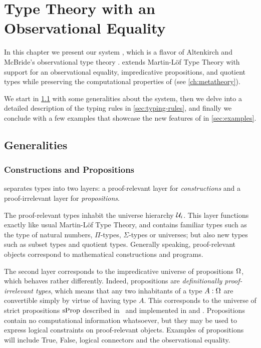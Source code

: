 \chapter{Type Theory with an Observational Equality}
\label{sec:type-theory-with}

% 
In this chapter we present our system \SetoidCC, which is a flavor of 
Altenkirch and McBride's observational type theory .
% 
\SetoidCC extends Martin-Löf Type Theory with support for an observational 
equality, impredicative propositions, and quotient types while preserving the
computational properties of \MLTT (see \cref{ch:metatheory}).

We start in \cref{sec:generalities} with some generalities about the system, then we delve 
into a detailed description of the typing rules in \cref{sec:typing-rules}, and 
finally we conclude with a few examples that showcase the new features of 
\SetoidCC in \cref{sec:examples}.

\section{Generalities}
\label{sec:generalities}

\subsection{Constructions and Propositions}

\SetoidCC separates types into two layers: a proof-relevant layer for 
\emph{constructions} and a proof-irrelevant layer for \emph{propositions}. 

The proof-relevant types inhabit the universe hierarchy \( \mathcal{U}_i \).
% 
This layer functions exactly like usual Martin-Löf Type Theory, and
contains familiar types
such as the type of natural numbers, \( \Pi \)-types, \( \Sigma \)-types or 
universes; but also new types such as subset types and quotient types.
% 
Generally speaking, proof-relevant objects correspond to mathematical 
constructions and programs.

The second layer corresponds to the impredicative universe of propositions 
\( \Omega \), which behaves rather differently.
% 
Indeed, propositions are \emph{definitionally proof-irrelevant types}, which 
means that any two inhabitants of a type \( A : \Omega \) are convertible
simply by virtue of having type \( A \). 
% 
This corresponds to the universe of strict propositions
\( \mathrm{sProp} \) described in~ and implemented 
in \Coq and \Lean.
% 
Propositions contain no computational information whatsoever, but they may be 
used to express logical constraints on proof-relevant objects.
% 
Examples of propositions will include True, False, logical connectors and the 
observational equality.

